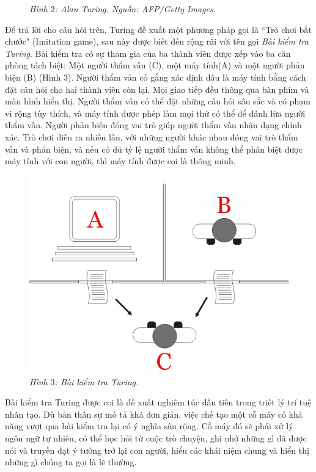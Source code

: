 \begin{multicols}{2}
\begin{figure}[H]
		\caption{\small\textit{\color{timhieukhoahoc}Hình $2$: Alan Turing. Nguồn: AFP/Getty Images.}}
		\vspace*{-10pt}
	\end{figure}
	Để trả lời cho câu hỏi trên, Turing đề xuất một phương pháp gọi là ``Trò chơi bắt chước" (Imitation game), sau này được biết đến rộng rãi với tên gọi \textit{Bài kiểm tra Turing}. Bài kiểm tra có sự tham gia của ba thành viên được xếp vào ba căn phòng tách biệt: Một người thẩm vấn (C), một máy tính(A) và một người phản biện (B) (Hình $3$). Người thẩm vấn cố gắng xác định đâu là máy tính bằng cách đặt câu hỏi cho hai thành viên còn lại. Mọi giao tiếp đều thông qua bàn phím và màn hình hiển thị. Người thẩm vấn có thể đặt những câu hỏi sâu sắc và có phạm vi rộng tùy thích, và máy tính được phép làm mọi thứ có thể để đánh lừa người thẩm vấn. Người phản biện đóng vai trò giúp người thẩm vấn nhận dạng chính xác. Trò chơi diễn ra nhiều lần, với những người khác nhau đóng vai trò thẩm vấn và phản biện, và nếu có đủ tỷ lệ người thẩm vấn không thể phân biệt được máy tính với con người, thì máy tính được coi là thông minh.
	\begin{figure}[H]
		\vspace*{-5pt}
		\centering
		\captionsetup{labelformat= empty, justification=centering}
		\includegraphics[width= 1\linewidth]{Turing_test}
		\caption{\small\textit{\color{timhieukhoahoc}Hình $3$: Bài kiểm tra Turing.}}
		\vspace*{-10pt}
	\end{figure}
	Bài kiểm tra Turing được coi là đề xuất nghiêm túc đầu tiên trong triết lý trí tuệ nhân tạo. Dù bản thân sự mô tả khá đơn giản, việc chế tạo một cỗ máy có khả năng vượt qua bài kiểm tra lại có ý nghĩa sâu rộng. Cỗ máy đó sẽ phải xử lý ngôn ngữ tự nhiên, có thể học hỏi từ cuộc trò chuyện, ghi nhớ những gì đã được nói và truyền đạt ý tưởng trở lại con người, hiểu các khái niệm chung và hiển thị những gì chúng ta gọi là lẽ thường. 

\end{multicols}
